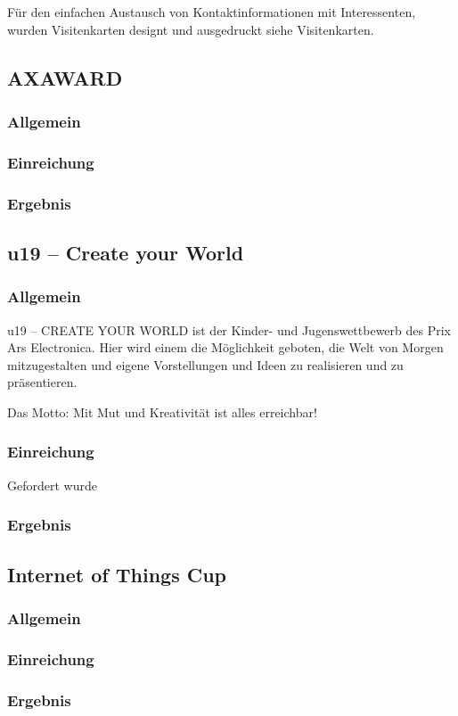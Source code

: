 Für den einfachen Austausch von Kontaktinformationen mit Interessenten, wurden Visitenkarten
designt und ausgedruckt siehe Visitenkarten.

\subsection{AXAWARD}
\subsubsection{Allgemein}

\subsubsection{Einreichung}

\subsubsection{Ergebnis}


\subsection{u19 -- Create your World}
\subsubsection{Allgemein}
u19 – CREATE YOUR WORLD ist der Kinder- und Jugenswettbewerb des \gls{Prix Ars Electronica}.
Hier wird einem die Möglichkeit geboten, die Welt von Morgen mitzugestalten und eigene Vorstellungen
und Ideen zu realisieren und zu präsentieren.


Das Motto: Mit Mut und Kreativität ist alles erreichbar!

\subsubsection{Einreichung}
Gefordert wurde
\subsubsection{Ergebnis}


\subsection{Internet of Things Cup}
\subsubsection{Allgemein}

\subsubsection{Einreichung}

\subsubsection{Ergebnis}
